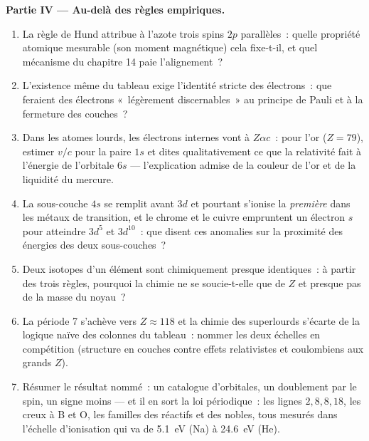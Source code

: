 \begin{problem}
\medskip\noindent\textbf{Partie IV --- Au-delà des règles empiriques.}
\begin{enumerate}[resume]
  \item La règle de Hund attribue à l'azote trois spins $2p$
        parallèles~: quelle propriété atomique mesurable (son moment
        magnétique) cela fixe-t-il, et quel mécanisme du chapitre 14
        paie l'alignement~?
  \item L'existence même du tableau exige l'identité stricte des
        électrons~: que feraient des électrons «~légèrement
        discernables~» au principe de Pauli et à la fermeture des
        couches~?
  \item Dans les atomes lourds, les électrons internes vont à
        $Z\alpha c$~: pour l'or ($Z = 79$), estimer $v/c$ pour la
        paire $1s$ et dites qualitativement ce que la relativité fait
        à l'énergie de l'orbitale $6s$ --- l'explication admise de la
        couleur de l'or et de la liquidité du mercure.
  \item La sous-couche $4s$ se remplit avant $3d$ et pourtant s'ionise
        la \emph{première} dans les métaux de transition, et le chrome
        et le cuivre empruntent un électron $s$ pour atteindre $3d^5$
        et $3d^{10}$~: que disent ces anomalies sur la proximité des
        énergies des deux sous-couches~?
  \item Deux isotopes d'un élément sont chimiquement presque
        identiques~: à partir des trois règles, pourquoi la chimie ne
        se soucie-t-elle que de $Z$ et presque pas de la masse du
        noyau~?
  \item La période 7 s'achève vers $Z \approx 118$ et la chimie des
        superlourds s'écarte de la logique naïve des colonnes du
        tableau~: nommer les deux échelles en compétition (structure
        en couches contre effets relativistes et coulombiens aux
        grands $Z$).
  \item Résumer le résultat nommé~: un catalogue d'orbitales, un
        doublement par le spin, un signe moins --- et il en sort la
        loi périodique~: les lignes $2, 8, 8, 18$, les creux à B et O,
        les familles des réactifs et des nobles, tous mesurés dans
        l'échelle d'ionisation qui va de \qty{5.1}{eV} (Na) à
        \qty{24.6}{eV} (He).
\end{enumerate}
\end{problem}
